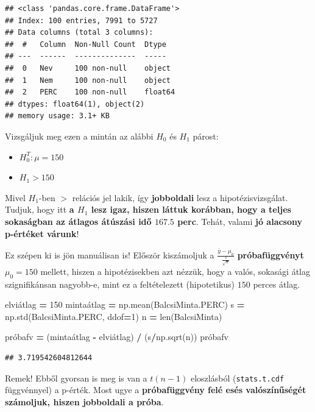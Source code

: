 \documentclass[
]{book}
\newenvironment{Shaded}{\begin{snugshade}}{\end{snugshade}}
\newcommand{\BuiltInTok}[1]{#1}
\newcommand{\DecValTok}[1]{\textcolor[rgb]{0.00,0.00,0.81}{#1}}
\newcommand{\NormalTok}[1]{#1}
\newcommand{\OperatorTok}[1]{\textcolor[rgb]{0.81,0.36,0.00}{\textbf{#1}}}
\providecommand{\tightlist}{%
  \setlength{\itemsep}{0pt}\setlength{\parskip}{0pt}}
\begin{document}
\begin{verbatim}
## <class 'pandas.core.frame.DataFrame'>
## Index: 100 entries, 7991 to 5727
## Data columns (total 3 columns):
##  #   Column  Non-Null Count  Dtype  
## ---  ------  --------------  -----  
##  0   Nev     100 non-null    object 
##  1   Nem     100 non-null    object 
##  2   PERC    100 non-null    float64
## dtypes: float64(1), object(2)
## memory usage: 3.1+ KB
\end{verbatim}

Vizsgáljuk meg ezen a mintán az alábbi \(H_0\) és \(H_1\) párost:

\begin{itemize}
\tightlist
\item
  \(H_0^T:\mu=150\)
\item
  \(H_1 > 150\)
\end{itemize}

Mivel \(H_1\)-ben \(>\) relációs jel lakik, így \textbf{jobboldali} lesz a hipotézisvizsgálat.
Tudjuk, hogy itt \textbf{a \(H_1\) lesz igaz, hiszen láttuk korábban, hogy a teljes sokaságban az átlagos átúszási idő \(167.5\) perc}. Tehát, valami \textbf{jó alacsony p-értéket várunk}!

Ez szépen ki is jön manuálisan is! Először kiszámoljuk a \(\frac{\bar{y}-\mu_0}{\frac{s}{\sqrt{n}}}\) \textbf{próbafüggvényt} \(\mu_0=150\) mellett, hiszen a hipotézisekben azt nézzük, hogy a valós, sokasági átlag szignifikánsan nagyobb-e, mint ez a feltételezett (hipotetikus) \(150\) perces átlag.

\begin{Shaded}
\begin{Highlighting}[]
\NormalTok{elviátlag }\OperatorTok{=} \DecValTok{150}
\NormalTok{mintaátlag }\OperatorTok{=}\NormalTok{ np.mean(BalcsiMinta.PERC)}
\NormalTok{s }\OperatorTok{=}\NormalTok{ np.std(BalcsiMinta.PERC, ddof}\OperatorTok{=}\DecValTok{1}\NormalTok{)}
\NormalTok{n }\OperatorTok{=} \BuiltInTok{len}\NormalTok{(BalcsiMinta)}

\NormalTok{próbafv }\OperatorTok{=}\NormalTok{ (mintaátlag }\OperatorTok{{-}}\NormalTok{ elviátlag) }\OperatorTok{/}\NormalTok{ (s}\OperatorTok{/}\NormalTok{np.sqrt(n))}
\NormalTok{próbafv}
\end{Highlighting}
\end{Shaded}

\begin{verbatim}
## 3.719542604812644
\end{verbatim}

Remek! Ebből gyorsan is meg is van a \(t(n-1)\) eloszlásból (\texttt{stats.t.cdf} függvénnyel) a p-érték. Most ugye a \textbf{próbafüggvény felé esés valószínűségét számoljuk, hiszen jobboldali a próba}.
\end{document}
